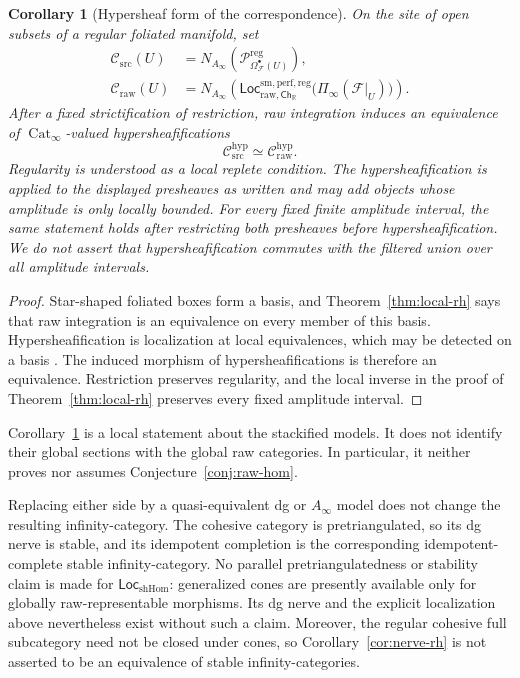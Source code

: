\documentclass[12pt]{amsart}
\newtheorem{cor}[thm]{Corollary}
\theoremstyle{definition}
\theoremstyle{remark}
\numberwithin{equation}{section}
\newcommand{\CF}{{\mathcal F}}
\newcommand{\R}{{\mathbb{R}}}
\newcommand{\1}{{\mathbb{1}}}
\newcommand{\Ch}{\mathsf{Ch}}
\newcommand{\Loc}{\mathsf{Loc}}
\begin{document}
\begin{cor}[Hypersheaf form of the correspondence]
\label{cor:hypersheaf-rh}
On the site of open subsets of a regular foliated manifold, set
\begin{align*}
 \mathcal C_{\mathrm{src}}(U)
 &=
 N_{A_\infty}\left(
 \mathcal P_{\Omega^\bullet_{\CF}(U)}^{\mathrm{reg}}
 \right),\\
 \mathcal C_{\mathrm{raw}}(U)
 &=
 N_{A_\infty}\left(
 \Loc_{\mathrm{raw},\Ch_{\R}}^{\mathrm{sm,perf,reg}}
 \bigl(\Pi_\infty(\CF|_U)\bigr)
 \right).
\end{align*}
After a fixed strictification of restriction, raw integration induces
an equivalence of $\operatorname{Cat}_\infty$-valued
hypersheafifications
\[
 \mathcal C_{\mathrm{src}}^{\mathrm{hyp}}
 \simeq
 \mathcal C_{\mathrm{raw}}^{\mathrm{hyp}}.
\]
 Regularity is understood as a local replete condition.  The
 hypersheafification is applied to the displayed presheaves as written
 and may add objects whose amplitude is only locally bounded.
 For every fixed finite amplitude interval, the same statement holds
 after restricting both presheaves before hypersheafification.  We do
 not assert that hypersheafification commutes with the filtered union
 over all amplitude intervals.
 \end{cor}

\begin{proof}
Star-shaped foliated boxes form a basis, and
Theorem~\ref{thm:local-rh} says that raw integration is an equivalence
on every member of this basis.  Hypersheafification is localization at
local equivalences, which may be detected on a basis
\cite[Section 6.5.2]{LurHT}.  The induced morphism of
hypersheafifications is therefore an equivalence.  Restriction
preserves regularity, and the local inverse in the proof of
Theorem~\ref{thm:local-rh} preserves every fixed amplitude interval.
\end{proof}

Corollary~\ref{cor:hypersheaf-rh} is a local statement about the
stackified models.  It does not identify their global sections with
the global raw categories.  In particular, it neither proves nor
assumes Conjecture~\ref{conj:raw-hom}.

Replacing either side by a quasi-equivalent dg or $A_\infty$ model does
not change the resulting infinity-category.  The cohesive category is
pretriangulated, so its dg nerve is stable, and its idempotent
completion is the corresponding idempotent-complete stable
infinity-category.  No parallel pretriangulatedness or stability claim
is made for $\Loc_{\mathrm{shHom}}$: generalized cones are presently
available only for globally raw-representable morphisms.  Its dg nerve
and the explicit localization above nevertheless exist without such a
claim.  Moreover, the regular cohesive full subcategory need not be
closed under cones, so Corollary~\ref{cor:nerve-rh} is not asserted to
be an equivalence of stable infinity-categories.
\end{document}
